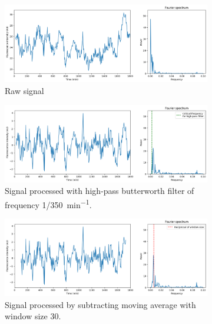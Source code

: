 \begin{figure}
  \centering
  \begin{subfigure}[htpb]{0.8\textwidth}
   \centering
   \includegraphics[width=\textwidth]{fft_raw}
   \caption{
     Raw signal
   }
   \label{fig:analysis-filter-raw}
  \end{subfigure}
  \begin{subfigure}[htpb]{0.8\textwidth}
   \centering
   \includegraphics[width=\textwidth]{fft_butterworth}
   \caption{
     Signal processed with high-pass butterworth filter of frequency \SI{1/350}{\minute^{-1}}.
   }
   \label{fig:analysis-filter-butterworth}
  \end{subfigure}
  \begin{subfigure}[htpb]{0.8\textwidth}
   \centering
   \includegraphics[width=\textwidth]{fft_slidingwindow}
   \caption{
     Signal processed by subtracting moving average with window size 30.
   }
   \label{fig:analysis-filter-slidingwindow}
  \end{subfigure}
  \begin{subfigure}[htpb]{0.8\textwidth}

\end{subfigure}
\end{figure}
